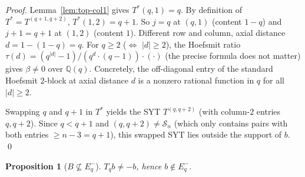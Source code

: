 \documentclass[11pt]{article}
\newtheorem{proposition}[theorem]{Proposition}
\theoremstyle{definition}
\begin{document}
\begin{proof}
Lemma~\ref{lem:top-col1} gives $T^*(q, 1) = q$.  By definition of
$T^* = T^{(q+1, q+2)}$, $T^*(1, 2) = q+1$.  So $j = q$ at $(q,1)$
(content $1 - q$) and $j+1 = q+1$ at $(1,2)$ (content $1$).
Different row and column, axial distance
$d = 1 - (1-q) = q$.  For $q \ge 2$ ($\Leftrightarrow$ $|d| \ge 2$),
the Hoefsmit ratio
$\tau(d) = (q^{|d|}-1)/(q^d \cdot (q-1))\cdot(\cdot)$ (the precise
formula does not matter) gives $\beta \ne 0$ over $\mathbb{Q}(q)$.
Concretely, the off-diagonal entry of the standard Hoefsmit
$2$-block at axial distance $d$ is a nonzero rational function in
$q$ for all $|d| \ge 2$.

Swapping $q$ and $q+1$ in $T^*$ yields the SYT $T^{(q, q+2)}$ (with
column-$2$ entries $q, q+2$).  Since $q < q+1$ and $(q, q+2) \ne
\mathcal{S}_n$ (which only contains pairs with both entries $\ge n-3 = q+1$),
this swapped SYT lies outside the support of $b$.
\qed
\end{proof}

\begin{proposition}[$B \not\subseteq E_q^-$]\label{prop:not-Eq-minus}
$T_q b \ne -b$, hence $b \notin E_q^-$.
\end{proposition}
\end{document}
